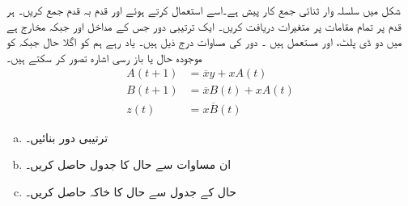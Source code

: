  شکل      میں سلسلہ وار ثنائی جمع کار  پیش ہے۔اسے استعمال کرتے ہوئے  اور   قدم بہ قدم   جمع کریں۔ ہر قدم پر  تمام مقامات پر متغیرات دریافت کریں۔
ایک ترتیبی  دور جس کے مداخل  اور   جبکہ مخارج  ہے   میں دو ڈی پلٹ،   اور  مستعمل ہیں ۔ دور کی مساوات درج ذیل   ہیں۔ یاد رہے ہم  کو اگلا حال  جبکہ  کو موجودہ حال یا باز رسی اشارہ   تصور کر سکتے ہیں۔
\begin{align*}
A(t+1)&=\overline{x}y+xA(t)\\
B(t+1)&=\overline{x}B(t)+xA(t)\\
z(t)&=x\overline{B}(t)
\end{align*}
\begin{enumerate}[a.]
\item
 ترتیبی دور  بنائیں۔ 
\item
  ان مساوات سے حال کا جدول حاصل کریں۔ 
\item
  حال  کے جدول سے حال کا خاکہ حاصل کریں۔
\end{enumerate}

